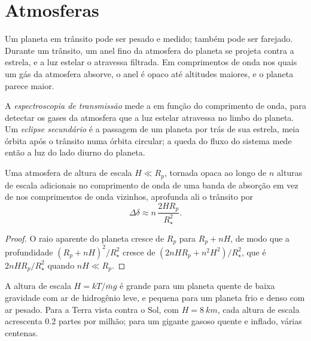 \section{Atmosferas}\label{sec:b3:exoplanets:atmospheres}

Um planeta em trânsito pode ser pesado e medido; também pode ser farejado.
Durante um trânsito, um anel fino da atmosfera do planeta se projeta contra
a estrela, e a luz estelar o atravessa filtrada. Em comprimentos de onda nos
quais um gás da atmosfera absorve, o anel é opaco até altitudes maiores, e
o planeta parece maior.

\begin{definition}\label{def:b3:exoplanets:transmission}
A \emph{espectroscopia de transmissão} mede
a  em função do comprimento de onda, para detectar os
gases da atmosfera que a luz estelar atravessa no limbo do planeta. Um
\emph{eclipse secundário} é a passagem de um
planeta por trás de sua estrela, meia órbita após o trânsito numa órbita
circular; a queda do fluxo do sistema mede então a luz do lado diurno do
planeta.
\end{definition}

\begin{proposition}\label{prop:b3:exoplanets:transmission}
Uma atmosfera de altura de escala $H \ll R_p$, tornada opaca ao longo de $n$
alturas de escala adicionais no comprimento de onda de uma banda de absorção
em vez de nos comprimentos de onda vizinhos, aprofunda ali o trânsito por
\[
\Delta\delta \approx n\,\frac{2HR_p}{R_\star^2} .
\]
\end{proposition}

\begin{proof}
O raio aparente do planeta cresce de $R_p$ para $R_p + nH$, de modo que a
profundidade $(R_p + nH)^2/R_\star^2$ cresce de $(2nHR_p + n^2H^2)/R_\star^2$,
que é $2nHR_p/R_\star^2$ quando $nH \ll R_p$.
\end{proof}

A altura de escala $H = kT/\bar m g$ é grande para um planeta quente de baixa
gravidade com ar de hidrogênio leve, e pequena para um planeta frio e denso com
ar pesado. Para a Terra vista contra o Sol, com $H = \qty{8}{km}$, cada altura
de escala acrescenta 0.2 partes por milhão; para um gigante gasoso quente e
inflado, várias centenas.

